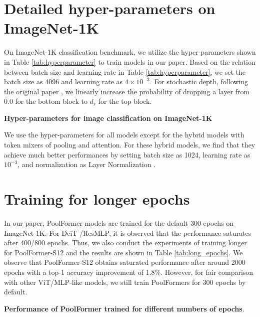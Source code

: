 \section{Detailed hyper-parameters on ImageNet-1K}

On ImageNet-1K classification benchmark, we utilize the hyper-parameters shown in Table \ref{tab:hyperparameter} to train models in our paper. Based on the relation between batch size and learning rate in Table \ref{tab:hyperparameter}, we set the batch size as 4096 and learning rate as $4\times 10^{-3}$. For stochastic depth, following the original paper \cite{stochastic_depth}, we linearly increase the probability of dropping a layer from 0.0 for the bottom block to $d_r$ for the top block.

\begin{table}[htbp]
\centering

\vspace{-2mm}
\caption{\textbf{Hyper-parameters for image classification on ImageNet-1K}
\label{tab:hyperparameter}
}
\end{table}

We use the hyper-parameters for all models except for 
the hybrid models with token mixers of pooling and attention. 
For these hybrid models, we find that
they achieve much better performances
by setting batch size as 1024, 
learning rate as $10^{-3}$,
and normalization as
Layer Normalization \cite{layer_norm}.


\section{Training for longer epochs}
In our paper, PoolFormer models are trained for the default 300 epochs on ImageNet-1K. For DeiT \cite{deit}/ResMLP\cite{resmlp}, it is observed that the performance saturates after 400/800 epochs. Thus, we also conduct the experiments of training longer for PoolFormer-S12 and the results are shown in Table \ref{tab:long_epochs}. We observe that PoolFormer-S12 obtains saturated performance after around 2000 epochs with a top-1 accuracy improvement of 1.8\%. However, for fair comparison with other ViT/MLP-like models, we still train PoolFormers for 300 epochs by default.



\begin{table}[t]
\centering
\setlength{\tabcolsep}{10pt}

\vspace{-2mm}
\caption{\textbf{Performance of PoolFormer trained for different numbers of epochs}.}
\label{tab:long_epochs} 
\end{table}

